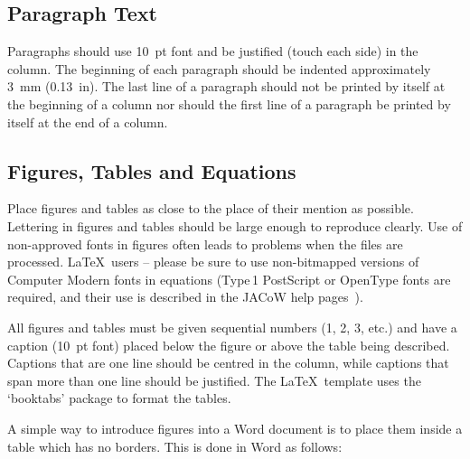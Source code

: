 \documentclass[acus]{jacow}
\begin{document}
\subsection{Paragraph Text}

Paragraphs should use \SI{10}{pt} font and be justified (touch each side) in
the column. The beginning of each paragraph should be indented
approximately \SI{3}{mm} (\SI{0.13}{in}). The last line of a paragraph should not be
printed by itself at the beginning of a column nor should the first line of
a paragraph be printed by itself at the end of a column.

\subsection{Figures, Tables and Equations}

Place figures and tables as close to the place of their mention as
possible. Lettering in figures and tables should be large enough to
reproduce clearly. Use of non-approved fonts in figures often leads to
problems when the files are processed. \LaTeX\ users -- please be sure to use
non-bitmapped versions of Computer Modern fonts in equations (Type\,1 PostScript
or OpenType fonts are required, and their use is described in the JACoW help
pages~\cite{jacow-help}).

All figures and tables must be given sequential numbers (1, 2, 3, etc.) and
have a caption (\SI{10}{pt} font) placed below the figure or above the table being described.
Captions that are one line should be centred in the column, while captions
that span more than one line should be justified. The \LaTeX\ template uses the \enquote*{booktabs}
package to format the tables.

A simple way to introduce figures into a Word document is to place them inside a table which has no borders. This is done in Word as follows:
\end{document}
